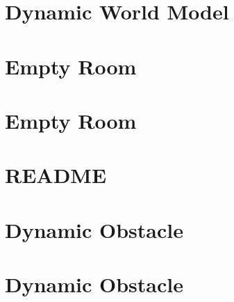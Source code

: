 \documentclass[twoside]{book}
\newcommand{\+}{\discretionary{\mbox{\scriptsize$\hookleftarrow$}}{}{}}
\begin{document}
\chapter{Dynamic World Model}
\label{md_smacc2_sm_reference_library_sm_dance_bot_warehouse_models_dynamic_world_README}

\chapter{Empty Room}
\label{md_smacc2_sm_reference_library_sm_dance_bot_warehouse_models_empty_room_copy_README}

\chapter{Empty Room}
\label{md_smacc2_sm_reference_library_sm_dance_bot_warehouse_models_empty_room_README}

\chapter{README}
\label{md_smacc2_sm_reference_library_sm_dance_bot_warehouse_README}

\chapter{Dynamic Obstacle}
\label{md_smacc2_sm_reference_library_sm_dance_bot_warehouse_2_models_dynamic_obstacle_copy_README}

\chapter{Dynamic Obstacle}
\label{md_smacc2_sm_reference_library_sm_dance_bot_warehouse_2_models_dynamic_obstacle_README}

\end{document}
